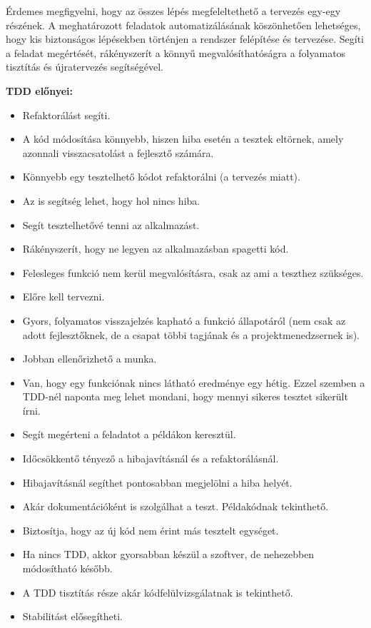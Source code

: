 Érdemes megfigyelni, hogy az összes lépés megfeleltethető a tervezés egy-egy részének. A meghatározott feladatok automatizálásának köszönhetően lehetséges, hogy kis biztonságos lépésekben történjen a rendszer felépítése és tervezése. Segíti a feladat megértését, rákényszerít a könnyű megvalósíthatóságra a folyamatos tisztítás és újratervezés segítségével.

\textbf{TDD előnyei:}
\hfill\\
\begin{itemize}
\item Refaktorálást segíti.
\item A kód módosítása könnyebb, hiszen hiba esetén a tesztek eltörnek, amely azonnali visszacsatolást a fejlesztő számára.
\item Könnyebb egy tesztelhető kódot refaktorálni (a tervezés miatt).
\item Az is segítség lehet, hogy hol nincs hiba.
\item Segít tesztelhetővé tenni az alkalmazást.
\item Rákényszerít, hogy ne legyen az alkalmazásban spagetti kód.
\item Felesleges funkció nem kerül megvalósításra, csak az ami a teszthez szükséges.
\item Előre kell tervezni.
\item Gyors, folyamatos visszajelzés kapható a funkció állapotáról (nem csak az adott fejlesztőknek, de a csapat többi tagjának és a projektmenedzsernek is).
\item Jobban ellenőrizhető a munka.
\item Van, hogy egy funkciónak nincs látható eredménye egy hétig. Ezzel szemben a TDD-nél naponta meg lehet mondani, hogy mennyi sikeres tesztet sikerült írni.
\item Segít megérteni a feladatot a példákon keresztül.
\item Időcsökkentő tényező a hibajavításnál és a refaktorálásnál.
\item Hibajavításnál segíthet pontosabban megjelölni a hiba helyét.
\item Akár dokumentációként is szolgálhat a teszt. Példakódnak tekinthető.
\item Biztosítja, hogy az új kód nem érint más tesztelt egységet.
\item Ha nincs TDD, akkor gyorsabban készül a szoftver, de nehezebben módosítható később.
\item A TDD tisztítás része akár kódfelülvizsgálatnak is tekinthető.
\item Stabilitást elősegítheti.
\end{itemize}

